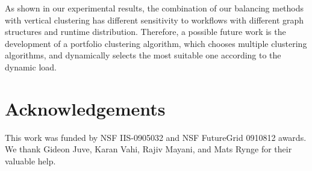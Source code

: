 As shown in our experiment{al }results, the combination of our balancing methods with vertical clustering {has }different sensitivity to workflows with {different }graph structures and runtime distribution. Therefore, a possible future work is the development of a portfolio clustering {algorithm, }which chooses multiple clustering algorithms, and dynamically selects {the }most suitable one according to the dynamic load.



\section*{Acknowledgements}
\footnotesize
This work was funded by NSF IIS-0905032 and NSF FutureGrid 0910812 awards. We thank Gideon Juve, Karan Vahi, Rajiv Mayani, and Mats Rynge for their valuable help. 